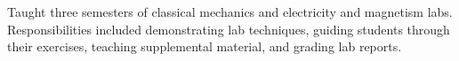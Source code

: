 \documentclass[10pt]{res}
\begin{document}
\begin{resume}
    Taught three semesters of classical mechanics and electricity and magnetism labs. Responsibilities included demonstrating lab techniques, guiding students through their exercises, teaching supplemental material, and grading lab reports.
%   



\end{resume}
\end{document}
